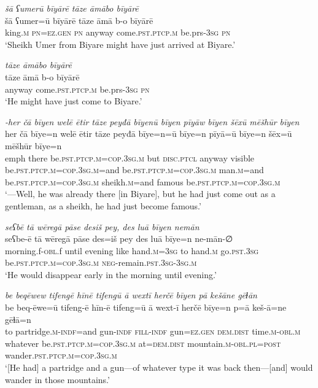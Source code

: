 \ea \label{ŠJ.2}
\textit{šā ʕumerū bīyārē tāze āmābo bīyārē} \\ 
\gll šā ʕumer=ū bīyārē tāze āmā b-o bīyārē \\ 
 king\textsc{.m} \textsc{pn}\textsc{=ez.gen} \textsc{pn} anyway come\textsc{.pst}\textsc{.ptcp}\textsc{.m} be.prs\textsc{-3sg} \textsc{pn} \\ 
\glt `Sheikh Umer from Biyare might have just arrived at Biyare.'
\z 
 
\ea \label{ŠJ.3}
\textit{tāze āmābo bīyārē} \\ 
\gll tāze āmā b-o bīyārē \\ 
 anyway come\textsc{.pst}\textsc{.ptcp}\textsc{.m} be.prs\textsc{-3sg} \textsc{pn} \\ 
\glt `He might have just come to Biyare.'
\z 
 
\ea \label{ŠJ.5}
\textit{-her čā bīyen welē ētir tāze peyđā bīyenū bīyen pīyāw bīyen šēxū mēšhūr bīyen} \\ 
\gll her čā bīye=n welē ētir tāze peyđā bīye=n=ū bīye=n pīyā=ū bīye=n šēx=ū mēšhūr bīye=n \\ 
 emph there be\textsc{.pst}\textsc{.ptcp}\textsc{.m}\textsc{=cop}\textsc{.3sg}\textsc{.m} but \textsc{disc.ptcl} anyway visible be\textsc{.pst}\textsc{.ptcp}\textsc{.m}\textsc{=cop}\textsc{.3sg}\textsc{.m}=and be\textsc{.pst}\textsc{.ptcp}\textsc{.m}\textsc{=cop}\textsc{.3sg}\textsc{.m} man\textsc{.m}=and be\textsc{.pst}\textsc{.ptcp}\textsc{.m}\textsc{=cop}\textsc{.3sg}\textsc{.m} sheikh\textsc{.m}=and famous be\textsc{.pst}\textsc{.ptcp}\textsc{.m}\textsc{=cop}\textsc{.3sg}\textsc{.m} \\ 
\glt `—Well, he was already there [in Biyare], but he had just come out as a gentleman, as a sheikh, he had just become famous.'
\z 
 
\ea \label{ŠJ.6}
\textit{seʕbē tā wēregā pāse desiš pey, des luā bīyen nemān} \\ 
\gll seʕbe-ē tā wēregā pāse des=iš pey des luā bīye=n ne-mān-∅ \\ 
 morning.f\textsc{-obl}.f until evening like hand\textsc{.m}\textsc{=3sg} to hand\textsc{.m} go\textsc{.pst}\textsc{.3sg} be\textsc{.pst}\textsc{.ptcp}\textsc{.m}\textsc{=cop}\textsc{.3sg}\textsc{.m} \textsc{neg-}remain\textsc{.pst}\textsc{.3sg}\textsc{-3sg}\textsc{.m} \\ 
\glt `He would disappear early in the morning until evening.'
\z 
 
\ea \label{ŠJ.7}
\textit{be beqēwew tifengē hīnē tifengū ā wextī herčē bīyen pā kešāne gēɫān} \\ 
\gll be beq-ēwe=ū tifeng-ē hīn-ē tifeng=ū ā wext-ī herčē bīye=n p=ā keš-ā=ne gēɫā=n \\ 
 to partridge\textsc{.m}\textsc{-indf}=and gun\textsc{-indf} \textsc{fill}\textsc{-indf} gun\textsc{=ez.gen} \textsc{dem.dist} time\textsc{.m}\textsc{-obl}\textsc{.m} whatever be\textsc{.pst}\textsc{.ptcp}\textsc{.m}\textsc{=cop}\textsc{.3sg}\textsc{.m} at=\textsc{dem.dist} mountain\textsc{.m}\textsc{-obl}\textsc{.pl}\textsc{=\textsc{post}} wander\textsc{.pst}\textsc{.ptcp}\textsc{.m}\textsc{=cop}\textsc{.3sg}\textsc{.m} \\ 
\glt `[He had] a partridge and a gun—of whatever type it was back then—[and] would wander in those mountains.'
\z 
 
